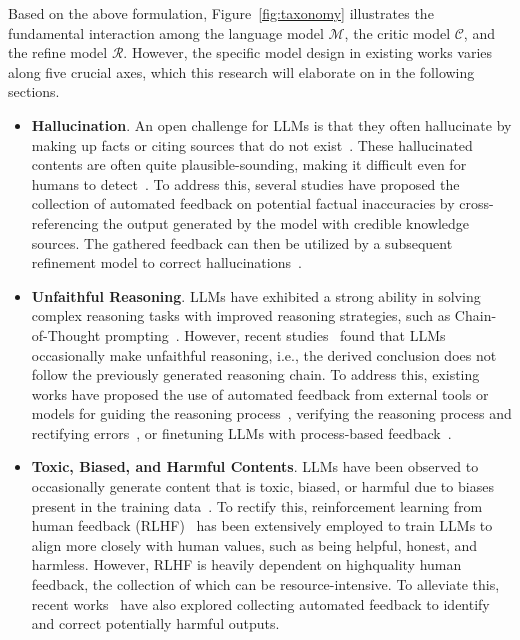 \documentclass[12pt]{extarticle}
\begin{document}
Based on the above formulation, Figure~\ref{fig:taxonomy} illustrates the fundamental interaction among the language model $\mathcal{M}$, the critic model $\mathcal{C}$, and the refine model $\mathcal{R}$. However, the specific model design in existing works varies along five crucial axes, which this research will elaborate on in the following sections.

\begin{itemize}
    \item \textbf{Hallucination}. An open challenge for LLMs is that they often hallucinate by making up facts or citing sources that do not exist~\cite{li2023halueval, zhang2023language}. These hallucinated contents are often quite plausible-sounding, making it difficult even for humans to detect~\cite{clark2021thats}. To address this, several studies have proposed the collection of automated feedback on potential factual inaccuracies by cross-referencing the output generated by the model with credible knowledge sources. The gathered feedback can then be utilized by a subsequent refinement model to correct hallucinations~\cite{gao2023rarr, zhang2023language}.

    \item \textbf{Unfaithful Reasoning}. LLMs have exhibited a strong ability in solving complex reasoning tasks with improved reasoning strategies, such as Chain-of-Thought prompting~\cite{wei2023chainofthought}. However, recent studies~\cite{golovneva2023roscoe,ribeiro2023street,lyu2023faithful} found that LLMs occasionally make unfaithful reasoning, i.e., the derived conclusion does not follow the previously generated reasoning chain. To address this, existing works have proposed the use of automated feedback from external tools or models for guiding the reasoning process~\cite{xie2023selfevaluation, yao2023tree}, verifying the reasoning process and rectifying errors~\cite{he2022rethinking,pan2023logiclm}, or finetuning LLMs with process-based feedback~\cite{huang2022large, lightman2023lets}.

    \item \textbf{Toxic, Biased, and Harmful Contents}. LLMs have been observed to occasionally generate content that is toxic, biased, or harmful due to biases present in the training data~\cite{shaikh-etal-2023-second}. To rectify this, reinforcement learning from human feedback (RLHF)~\cite{ouyang2022training, bai2022training} has been extensively employed to train LLMs to align more closely with human values, such as being helpful, honest, and harmless. However, RLHF is heavily dependent on highquality human feedback, the collection of which can be resource-intensive. To alleviate this, recent works~\cite{lu2022quark, gou2023critic} have also explored collecting automated feedback to identify and correct potentially harmful outputs.


\end{itemize}
\end{document}
